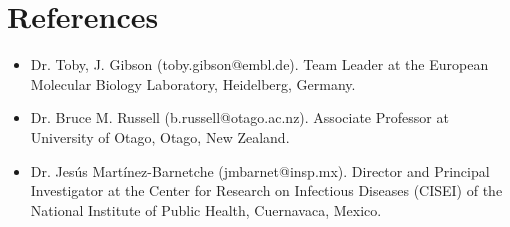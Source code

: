 \documentclass[11pt,a4paper,sans]{moderncv} %
\begin{document}
\section{References}
\begin{itemize}
  \item Dr. Toby, J. Gibson (toby.gibson@embl.de).
  Team Leader at the European Molecular Biology Laboratory, Heidelberg, Germany.
  \item Dr. Bruce M. Russell (b.russell@otago.ac.nz).
  Associate Professor at University of Otago, Otago, New Zealand.
  \item Dr. Jes\'us Mart\'inez-Barnetche (jmbarnet@insp.mx).
  Director and Principal Investigator at the Center for Research on Infectious Diseases (CISEI) of the National Institute of Public Health, Cuernavaca, Mexico.
\end{itemize}
\end{document}
